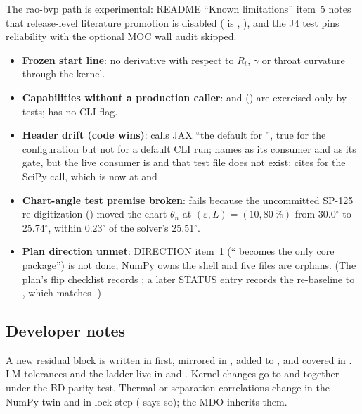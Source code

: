 The rao-bvp path is experimental: README ``Known limitations'' item~5 notes that release-level literature promotion is disabled ( is , ), and the J4 test pins reliability  with the optional MOC wall audit skipped.
\begin{itemize}
\item \textbf{Frozen start line}: no derivative with respect to $R_t$, $\gamma$ or throat curvature through the kernel.
\item \textbf{Capabilities without a production caller}:  and  () are exercised only by tests;  has no CLI flag.
\item \textbf{Header drift (code wins)}:  calls JAX ``the default for '', true for the configuration but not for a default CLI run;  names  as its consumer and  as its gate, but the live consumer is  and that test file does not exist;  cites  for the SciPy call, which is now at  and .
\item \textbf{Chart-angle test premise broken}:  fails because the uncommitted SP-125 re-digitization () moved the chart $\theta_n$ at $(\varepsilon,L)=(10,80\,\%)$ from 30.0$^\circ$ to 25.74$^\circ$, within 0.23$^\circ$ of the solver's 25.51$^\circ$.
\item \textbf{Plan direction unmet}: DIRECTION item~1 (`` becomes the only core package'') is not done; NumPy owns the shell and five  files are orphans. (The plan's flip checklist records ; a later STATUS entry records the re-baseline to , which matches .)
\end{itemize}

\subsection{Developer notes}

A new residual block is written in  first, mirrored in , added to , and covered in . LM tolerances and the ladder live in  and . Kernel changes go to  and  together under the BD parity test. Thermal or separation correlations change in the NumPy twin and  in lock-step ( says so); the MDO inherits them.

